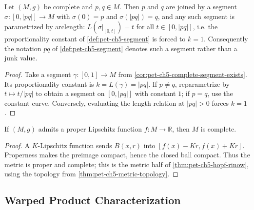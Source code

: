 \begin{corollary}
  \label{cor:pet-ch5-segment-notation-unitspeed}


  Let $(M,g)$ be complete and $p,q\in M$.  Then $p$ and $q$ are joined by a segment
  $\sigma:[0,|pq|]\to M$ with $\sigma(0)=p$ and $\sigma(|pq|)=q$, and any such
  segment is parametrized by arclength: $L(\sigma|_{[0,t]})=t$ for all
  $t\in[0,|pq|]$, i.e. the proportionality constant of \cref{def:pet-ch5-segment}
  is forced to $k=1$.  Consequently the notation $\overline{pq}$ of
  \cref{def:pet-ch5-segment} denotes such a segment rather than a junk value.
\end{corollary}
\begin{proof}

  \sketch
  Take a segment $\gamma:[0,1]\to M$ from
  \cref{cor:pet-ch5-complete-segment-exists}.  Its proportionality constant is
  $k=L(\gamma)=|pq|$.  If $p\ne q$, reparametrize by $t\mapsto t/|pq|$ to obtain
  a segment on $[0,|pq|]$ with constant $1$; if $p=q$, use the constant curve.
  Conversely, evaluating the length relation at $|pq|>0$ forces $k=1$.
\end{proof}

\begin{corollary}
  \label{cor:pet-ch5-proper-lipschitz-complete}


  If $(M,g)$ admits a proper Lipschitz function $f:M\to\mathbb R$, then $M$ is
  complete.
\end{corollary}
\begin{proof}

  \sketch
  A $K$-Lipschitz function sends $\bar B(x,r)$ into
  $[f(x)-Kr,f(x)+Kr]$. Properness makes the preimage compact, hence the closed ball
  compact. Thus the metric is proper and complete; this is the metric half of
  \cref{thm:pet-ch5-hopf-rinow}, using the topology from
  \cref{thm:pet-ch5-metric-topology}.
\end{proof}

\subsection{Warped Product Characterization}


